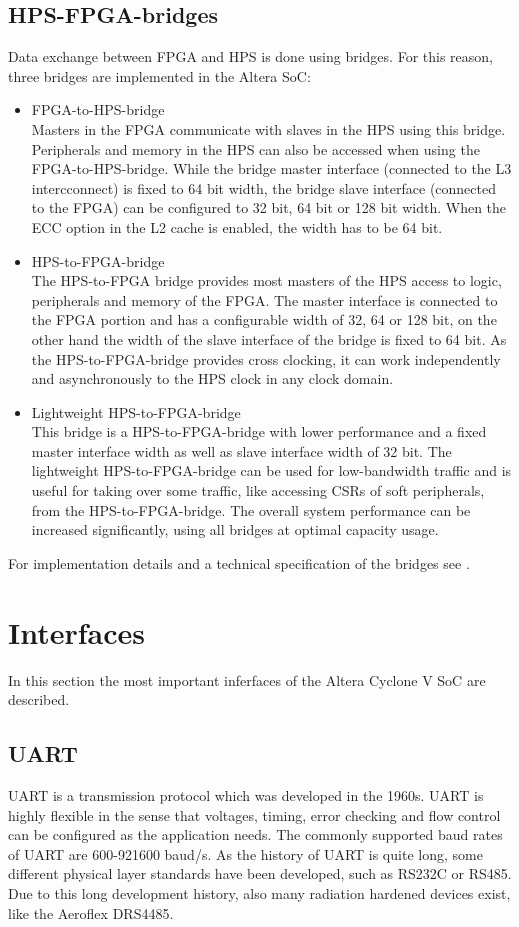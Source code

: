 \subsection{HPS-FPGA-bridges}
Data exchange between FPGA and HPS is done using bridges. For this reason, three bridges are implemented in the Altera SoC:
\begin{itemize}
\item FPGA-to-HPS-bridge\\
Masters in the FPGA communicate with slaves in the HPS using this bridge. Peripherals and memory in the HPS can also be accessed when using the FPGA-to-HPS-bridge. While the bridge master interface (connected to the L3 intercconnect)  is fixed to 64 bit width, the bridge slave interface (connected to the FPGA) can be configured to 32 bit, 64 bit or 128 bit width. When the ECC option in the L2 cache is enabled, the width has to be 64 bit. 
\item HPS-to-FPGA-bridge\\
The HPS-to-FPGA bridge provides most masters of the HPS access to logic, peripherals and memory of the FPGA. The master interface is connected to the FPGA portion and has a configurable width of 32, 64 or 128 bit, on the other hand the width of the slave interface of the bridge is fixed to 64 bit. As the HPS-to-FPGA-bridge provides cross clocking, it can work independently and asynchronously to the HPS clock in any clock domain. 
\item Lightweight HPS-to-FPGA-bridge\\
This bridge is a HPS-to-FPGA-bridge with lower performance and a fixed master interface width as well as slave interface width of 32 bit. The lightweight HPS-to-FPGA-bridge can be used for low-bandwidth traffic and is useful for taking over some traffic, like accessing CSRs of soft peripherals, from the HPS-to-FPGA-bridge. The overall system performance can be increased significantly, using all bridges at optimal capacity usage.
\end{itemize}
For implementation details and a technical specification of the bridges see \cite[chapter 8]{AlteraHPS15}.
\section{Interfaces}
In this section the most important inferfaces of the Altera Cyclone V SoC are described.
\subsection{UART}
UART is a transmission protocol which was developed in the 1960s. UART is highly flexible in the sense that voltages, timing, error checking and flow control can be configured as the application needs. The commonly supported baud rates of UART are 600-921600 baud/s. As the history of UART is quite long, some different physical layer standards have been developed, such as RS232C or RS485. Due to this long development history, also many radiation hardened devices exist, like the Aeroflex DRS4485.\cite{aeroflex14}
